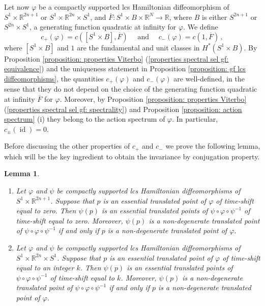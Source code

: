 \documentclass{amsart}
\DeclareMathOperator{\id}{id}
\newtheorem{lemma}[thm]{Lemma}
\theoremstyle{remark}
\begin{document}
Let now $\varphi$ be a compactly supported
lcs Hamiltonian diffeomorphism of $S^1 \times \mathbb{R}^{2n+1}$
or $S^1 \times \mathbb{R}^{2n} \times S^1$,
and $\overline{F}: S^1 \times B \times \mathbb{R}^N \rightarrow \mathbb{R}$,
where $B$ is either $S^{2n+1}$ or $S^{2n} \times S^1$,
a generating function quadratic at infinity for $\varphi$.
We define 
\[
c_+ (\varphi) = c ([S^1 \times B], \overline{F})
\quad \text{ and } \quad c_- (\varphi) = c (1, \overline{F}) \,,
\]
where $[S^1 \times B]$ and $1$
are the fundamental and unit classes in $H^{\ast} (S^1 \times B)$.
By Proposition \ref{proposition: properties Viterbo}
(\ref{properties spectral sel gf: equivalence})
and the uniqueness statement
in Proposition \ref{proposition: gf lcs diffeomorphisms}, the quantities 
$c_+ (\varphi)$ and $c_- (\varphi)$ are well-defined,
in the sense that they do not depend on the choice
of the generating function quadratic at infinity
$\overline{F}$ for $\varphi$.
Moreover,
by Proposition \ref{proposition: properties Viterbo}
(\ref{properties spectral sel gf: spectrality})
and Proposition \ref{proposition: action spectrum} (i)
they belong to the action spectrum of $\varphi$.
In particular,
$c_{\pm} (\id) = 0$.

Before discussing the other properties of $c_+$ and $c_-$
we prove the following lemma,
which will be the key ingredient
to obtain the invariance by conjugation property.

\begin{lemma}\label{lemma: translated points of conjugation}
\renewcommand{\theenumi}{\roman{enumi}} \
\begin{enumerate}
\item Let $\varphi$ and $\psi$ be  compactly supported
lcs Hamiltonian diffeomorphisms of $S^1 \times \mathbb{R}^{2n + 1}$.
Suppose that $p$ is an essential translated point of $\varphi$
of time-shift equal to zero.
Then $\psi(p)$ is an essential translated points of $\psi \circ \varphi \circ \psi^{-1}$
of time-shift equal to zero.
Moreover,
$\psi(p)$ is a non-degenerate translated point
of $\psi \circ \varphi \circ \psi^{-1}$
if and only if $p$ is a non-degenerate translated point of $\varphi$.

\item Let $\varphi$ and $\psi$ be compactly supported
lcs Hamiltonian diffeomorphisms of $S^1 \times \mathbb{R}^{2n} \times S^1$.
Suppose that $p$ is an essential translated point of $\varphi$
of time-shift equal to an integer $k$.
Then $\psi(p)$ is an essential translated points of $\psi \circ \varphi \circ \psi^{-1}$
of time-shift equal to $k$.
Moreover,
$\psi(p)$ is a non-degenerate translated point
of $\psi \circ \varphi \circ \psi^{-1}$
if and only if $p$ is a non-degenerate translated point of $\varphi$.
\end{enumerate}
\end{lemma}
\end{document}

